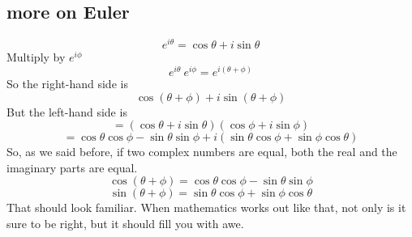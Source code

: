 \documentclass[11pt, oneside]{article}   	%
\begin{document}
\subsection*{more on Euler}
\[ e^{i \theta} = \cos \theta + i \sin \theta \]
Multiply by $e^{i \phi}$
\[ e^{i \theta} \ e^{i \phi} = e^{i (\theta + \phi)} \]
So the right-hand side is
\[ \cos (\theta + \phi) + i  \sin(\theta + \phi) \]
But the left-hand side is
\[ = (\cos \theta + i \sin \theta) (\cos \phi + i \sin \phi) \]
\[ = \cos \theta \cos \phi - \sin \theta \sin \phi + i (\sin \theta \cos \phi + \sin \phi \cos \theta ) \]
So, as we said before, if two complex numbers are equal, both the real and the imaginary parts are equal.
\[ \cos (\theta + \phi) = \cos \theta \cos \phi - \sin \theta \sin \phi \]
\[ \sin(\theta + \phi) = \sin \theta \cos \phi + \sin \phi \cos \theta \]
That should look familiar.  When mathematics works out like that, not only is it sure to be right, but it should fill you with awe.
\end{document}
